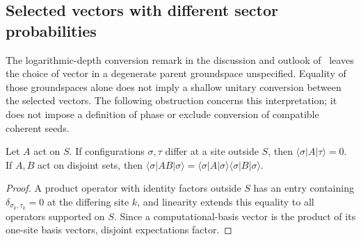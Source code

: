 \subsection{Selected vectors with different sector probabilities}
\label{sec:ldp_sector_weights}

The logarithmic-depth conversion remark in the discussion and outlook
of~\cite{Malz2024Preparation} leaves the choice of vector in a degenerate
parent groundspace unspecified. Equality of those groundspaces alone does
not imply a shallow unitary conversion between the selected vectors.
The following obstruction concerns this interpretation; it does not impose
a definition of phase or exclude conversion of compatible coherent seeds.

\begin{lemma}
    \label{thm:ldp_offsupport_matrix_elements}
    \leanok
    Let $A$ act on $S$. If configurations $\sigma,\tau$ differ at a site
    outside $S$, then $\langle\sigma|A|\tau\rangle=0$.
    If $A,B$ act on disjoint sets, then
    $\langle\sigma|AB|\sigma\rangle=
        \langle\sigma|A|\sigma\rangle\langle\sigma|B|\sigma\rangle$.
\end{lemma}
\begin{proof}
    \leanok
    A product operator with identity factors outside $S$ has an entry
    containing $\delta_{\sigma_k,\tau_k}=0$ at the differing site $k$,
    and linearity extends this equality to all operators supported on $S$.
    Since a computational-basis vector is the product of its one-site
    basis vectors, disjoint expectations factor.
\end{proof}

